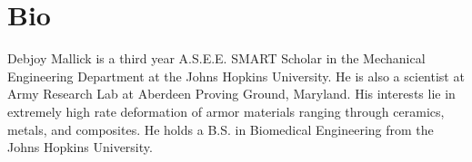 \documentclass[
journal=jacsat, %
manuscript=article]{achemso}
\begin{document}
\section{Bio}
Debjoy Mallick is a third year A.S.E.E. SMART Scholar in the Mechanical Engineering Department at the Johns Hopkins University. He is also a scientist at Army Research Lab at Aberdeen Proving Ground, Maryland. His interests lie in extremely high rate deformation of armor materials ranging through ceramics, metals, and composites. He holds a B.S. in Biomedical Engineering from the Johns Hopkins University.
%


\end{document}
